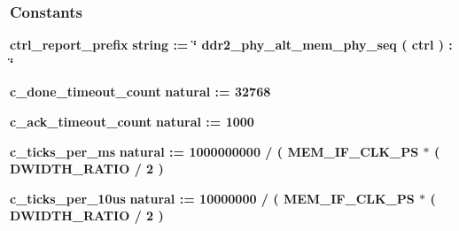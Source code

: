 \subsubsection*{Constants}
 \begin{DoxyCompactItemize}
\item 
{\bf ctrl\+\_\+report\+\_\+prefix} {\bfseries \textcolor{comment}{string}\textcolor{vhdlchar}{ }\textcolor{vhdlchar}{ }\textcolor{vhdlchar}{\+:}\textcolor{vhdlchar}{=}\textcolor{vhdlchar}{ }\textcolor{vhdlchar}{ }\textcolor{vhdlchar}{ }\textcolor{vhdlchar}{ }\textcolor{keyword}{\char`\"{} ddr2\+\_\+phy\+\_\+alt\+\_\+mem\+\_\+phy\+\_\+seq ( ctrl )  \+:  \char`\"{}}\textcolor{vhdlchar}{ }} 
\item 
{\bf c\+\_\+done\+\_\+timeout\+\_\+count} {\bfseries \textcolor{comment}{natural}\textcolor{vhdlchar}{ }\textcolor{vhdlchar}{ }\textcolor{vhdlchar}{\+:}\textcolor{vhdlchar}{=}\textcolor{vhdlchar}{ }\textcolor{vhdlchar}{ } \textcolor{vhdldigit}{32768} \textcolor{vhdlchar}{ }} 
\item 
{\bf c\+\_\+ack\+\_\+timeout\+\_\+count} {\bfseries \textcolor{comment}{natural}\textcolor{vhdlchar}{ }\textcolor{vhdlchar}{ }\textcolor{vhdlchar}{\+:}\textcolor{vhdlchar}{=}\textcolor{vhdlchar}{ }\textcolor{vhdlchar}{ } \textcolor{vhdldigit}{1000} \textcolor{vhdlchar}{ }} 
\item 
{\bf c\+\_\+ticks\+\_\+per\+\_\+ms} {\bfseries \textcolor{comment}{natural}\textcolor{vhdlchar}{ }\textcolor{vhdlchar}{ }\textcolor{vhdlchar}{\+:}\textcolor{vhdlchar}{=}\textcolor{vhdlchar}{ }\textcolor{vhdlchar}{ } \textcolor{vhdldigit}{1000000000} \textcolor{vhdlchar}{/}\textcolor{vhdlchar}{ }\textcolor{vhdlchar}{(}\textcolor{vhdlchar}{ }\textcolor{vhdlchar}{ }\textcolor{vhdlchar}{ }\textcolor{vhdlchar}{ }{\bfseries {\bf M\+E\+M\+\_\+\+I\+F\+\_\+\+C\+L\+K\+\_\+\+PS}} \textcolor{vhdlchar}{$\ast$}\textcolor{vhdlchar}{ }\textcolor{vhdlchar}{(}\textcolor{vhdlchar}{ }\textcolor{vhdlchar}{ }\textcolor{vhdlchar}{ }\textcolor{vhdlchar}{ }{\bfseries {\bf D\+W\+I\+D\+T\+H\+\_\+\+R\+A\+T\+IO}} \textcolor{vhdlchar}{/}\textcolor{vhdlchar}{ } \textcolor{vhdldigit}{2} \textcolor{vhdlchar}{ }\textcolor{vhdlchar}{)}\textcolor{vhdlchar}{ }} 
\item 
{\bf c\+\_\+ticks\+\_\+per\+\_\+10us} {\bfseries \textcolor{comment}{natural}\textcolor{vhdlchar}{ }\textcolor{vhdlchar}{ }\textcolor{vhdlchar}{\+:}\textcolor{vhdlchar}{=}\textcolor{vhdlchar}{ }\textcolor{vhdlchar}{ } \textcolor{vhdldigit}{10000000} \textcolor{vhdlchar}{/}\textcolor{vhdlchar}{ }\textcolor{vhdlchar}{(}\textcolor{vhdlchar}{ }\textcolor{vhdlchar}{ }\textcolor{vhdlchar}{ }\textcolor{vhdlchar}{ }{\bfseries {\bf M\+E\+M\+\_\+\+I\+F\+\_\+\+C\+L\+K\+\_\+\+PS}} \textcolor{vhdlchar}{$\ast$}\textcolor{vhdlchar}{ }\textcolor{vhdlchar}{(}\textcolor{vhdlchar}{ }\textcolor{vhdlchar}{ }\textcolor{vhdlchar}{ }\textcolor{vhdlchar}{ }{\bfseries {\bf D\+W\+I\+D\+T\+H\+\_\+\+R\+A\+T\+IO}} \textcolor{vhdlchar}{/}\textcolor{vhdlchar}{ } \textcolor{vhdldigit}{2} \textcolor{vhdlchar}{ }\textcolor{vhdlchar}{)}\textcolor{vhdlchar}{ }} 
\end{DoxyCompactItemize}

